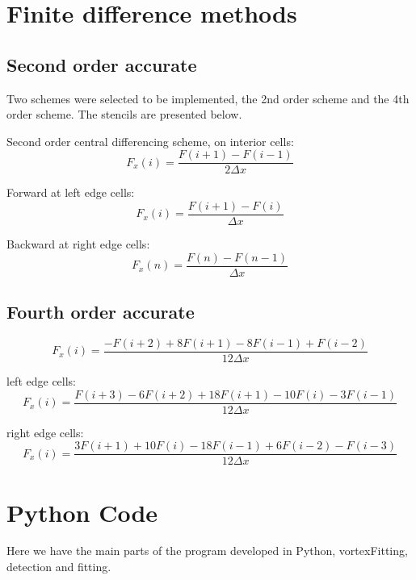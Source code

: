 \documentclass[12pt, a4paper, openany]{memoir}
\begin{document}
\newpage



\appendix

\chapter{Finite difference methods}

\section{Second order accurate}
\label{annex:finite}
Two schemes were selected to be implemented, the 2nd order scheme and the 4th order scheme. The stencils are presented below.

Second order central differencing scheme, on interior cells:
\begin{equation}
F_x(i) = \frac{F(i+1)-F(i-1)}{2 \Delta x}
\end{equation}

Forward at left edge cells:
\begin{equation}
F_x(i) = \frac{F(i+1)-F(i)}{\Delta x}
\end{equation}

Backward at right edge cells:
\begin{equation}
F_x(n) = \frac{F(n)-F(n-1)}{\Delta x}
\end{equation}

\section{Fourth order accurate}

\begin{equation}
F_x(i) = \frac{-F(i+2)+8F(i+1)-8F(i-1)+F(i-2)}{12 \Delta x}
\end{equation}

left edge cells:
\begin{equation}
F_x(i) = \frac{F(i+3)-6F(i+2)+18F(i+1)-10F(i) -3F(i-1)}{12 \Delta x}
\end{equation}

right edge cells:
\begin{equation}
F_x(i) = \frac{3F(i+1)+10F(i)-18F(i-1)+6F(i-2) -F(i-3)}{12 \Delta x}
\end{equation}

\chapter{Python Code}
Here we have the main parts of the program developed in Python, vortexFitting, detection and fitting.
\end{document}
